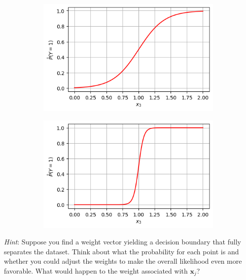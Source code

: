 \documentclass[11pt,addpoints,answers]{exam}
\newcommand{\xv}{\mathbf{x}}
\begin{document}
\begin{questions}
\begin{parts}
\begin{subparts}
    \begin{figure}[h]
        \centering
        \begin{subfigure}[t]{0.42\textwidth}
            \centering
            \includegraphics[width=\textwidth]{fig/Plot A.png}
            \caption{}
        \end{subfigure}
        \hfill
        \begin{subfigure}[t]{0.42\textwidth}
            \centering
            \includegraphics[width=\textwidth]{fig/Plot B.png}
            \caption{}
        \end{subfigure}
    \end{figure}

    \textit{Hint}: Suppose you find a weight vector yielding a decision boundary that fully separates the dataset. Think about what the probability for each point is and whether you could adjust the weights to make the overall likelihood even more favorable. What would happen to the weight associated with $\xv_j$?
 

\end{subparts}
\end{parts}
\end{questions}
\end{document}

